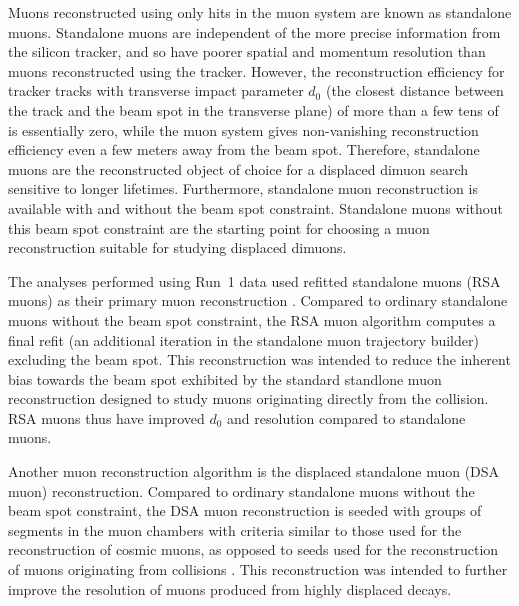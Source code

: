 Muons reconstructed using only hits in the muon system are known as standalone muons.
Standalone muons are independent of the more precise information from the silicon tracker, and so have poorer spatial and momentum resolution than muons reconstructed using the tracker.
However, the reconstruction efficiency for tracker tracks with transverse impact parameter $d_0$ (the closest distance between the track and the beam spot in the transverse plane) of more than a few tens of \cm is essentially zero, while the muon system gives non-vanishing reconstruction efficiency even a few meters away from the beam spot.
Therefore, standalone muons are the reconstructed object of choice for a displaced dimuon search sensitive to longer lifetimes.
Furthermore, standalone muon reconstruction is available with and without the beam spot constraint.
Standalone muons without this beam spot constraint are the starting point for choosing a muon reconstruction suitable for studying displaced dimuons.

The analyses performed using Run~1 data used refitted standalone muons (RSA muons) as their primary muon reconstruction \cite{CMS-PAS-EXO-14-012,CMS-AN-14-176}.
Compared to ordinary standalone muons without the beam spot constraint, the RSA muon algorithm computes a final refit (an additional iteration in the standalone muon trajectory builder) excluding the beam spot.
This reconstruction was intended to reduce the inherent bias towards the beam spot exhibited by the standard standlone muon reconstruction designed to study muons originating directly from the \pp collision.
RSA muons thus have improved $d_0$ and \pT resolution compared to standalone muons.

Another muon reconstruction algorithm is the displaced standalone muon (DSA muon) reconstruction.
Compared to ordinary standalone muons without the beam spot constraint, the DSA muon reconstruction is seeded with groups of segments in the muon chambers with criteria similar to those used for the reconstruction of cosmic muons, as opposed to seeds used for the reconstruction of muons originating from \pp collisions \cite{CMS-DP-2015-015}.
This reconstruction was intended to further improve the \pT resolution of muons produced from highly displaced decays.

